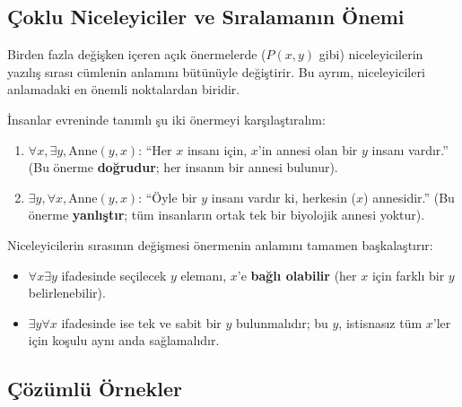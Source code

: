 \subsection{Çoklu Niceleyiciler ve Sıralamanın Önemi}

Birden fazla değişken içeren açık önermelerde ($P(x, y)$ gibi) niceleyicilerin yazılış sırası cümlenin anlamını bütünüyle değiştirir. Bu ayrım, niceleyicileri anlamadaki en önemli noktalardan biridir.

İnsanlar evreninde tanımlı şu iki önermeyi karşılaştıralım:
\begin{enumerate}
  \item $\forall x, \exists y, \text{Anne}(y, x)$: ``Her $x$ insanı için, $x$'in annesi olan bir $y$ insanı vardır.'' (Bu önerme \textbf{doğrudur}; her insanın bir annesi bulunur).
  \item $\exists y, \forall x, \text{Anne}(y, x)$: ``Öyle bir $y$ insanı vardır ki, herkesin ($x$) annesidir.'' (Bu önerme \textbf{yanlıştır}; tüm insanların ortak tek bir biyolojik annesi yoktur).
\end{enumerate}

Niceleyicilerin sırasının değişmesi önermenin anlamını tamamen başkalaştırır:
\begin{itemize}
  \item $\forall x \exists y$ ifadesinde seçilecek $y$ elemanı, $x$'e \textbf{bağlı olabilir} (her $x$ için farklı bir $y$ belirlenebilir).
  \item $\exists y \forall x$ ifadesinde ise tek ve sabit bir $y$ bulunmalıdır; bu $y$, istisnasız tüm $x$'ler için koşulu aynı anda sağlamalıdır.
\end{itemize}

\subsection{Çözümlü Örnekler}

